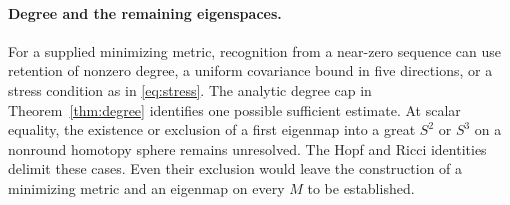 \documentclass[11pt]{article}
\numberwithin{equation}{section}
\begin{document}
\paragraph{Degree and the remaining eigenspaces.}
For a supplied minimizing metric, recognition from a near-zero
sequence can use retention of nonzero degree, a uniform covariance
bound in five directions, or a stress condition as in \eqref{eq:stress}.
The analytic degree cap in Theorem~\ref{thm:degree} identifies
one possible sufficient estimate. At scalar equality, the
existence or exclusion of a first eigenmap into a great
\(S^2\) or \(S^3\) on a nonround homotopy sphere remains unresolved.
The Hopf and Ricci identities delimit these cases. Even their
exclusion would leave the construction of a minimizing metric
and an eigenmap on every \(M\) to be established.



\end{document}

